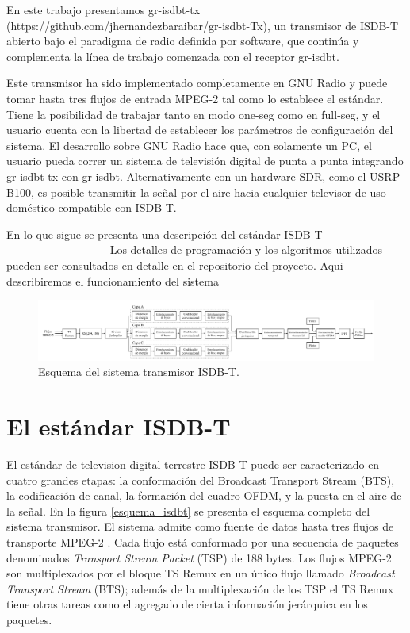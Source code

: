 \documentclass[journal,comsoc]{IEEEtran}
\begin{document}
En este trabajo presentamos gr-isdbt-tx (https://github.com/jhernandezbaraibar/gr-isdbt-Tx), un transmisor de ISDB-T abierto bajo el paradigma de radio definida por software, que continúa y complementa la línea de trabajo comenzada con el receptor gr-isdbt. 

Este transmisor ha sido implementado completamente en GNU Radio y puede tomar hasta tres flujos de entrada MPEG-2 tal como lo establece el estándar. Tiene la posibilidad de trabajar tanto en modo one-seg como en full-seg, y el usuario cuenta con la libertad de establecer los parámetros de configuración del sistema. El desarrollo sobre GNU Radio hace que, con solamente un PC, el usuario pueda correr un sistema de televisión digital de punta a punta integrando gr-isdbt-tx con gr-isdbt. Alternativamente con un hardware SDR, como el USRP B100, es posible transmitir la señal por el aire hacia cualquier televisor de uso doméstico compatible con ISDB-T.

En lo que sigue se presenta una descripción del estándar ISDB-T
---------------------------
Los detalles de programación y los algoritmos utilizados pueden ser consultados en detalle en el repositorio del proyecto. Aqui describiremos el funcionamiento del sistema
\begin{figure}[!h]
\centering
\includegraphics[width=7.1in]{figuras/esquema-tx}
\caption{Esquema del sistema transmisor ISDB-T.}
\label{esquema-tx}
\end{figure}

\section{El estándar ISDB-T}
El estándar de television digital terrestre ISDB-T puede ser caracterizado en cuatro grandes etapas: la conformación del Broadcast Transport Stream (BTS), la codificación de canal, la formación del cuadro OFDM, y la puesta en el aire de la señal. En la figura \ref{esquema_isdbt} se presenta el esquema completo del sistema transmisor.
El sistema admite como fuente de datos hasta tres flujos de transporte MPEG-2 \cite{MPEG}. Cada flujo está conformado por una secuencia de paquetes denominados \textit{Transport Stream Packet} (TSP) de 188 bytes. Los flujos MPEG-2 son multiplexados por el bloque TS Remux en un único flujo llamado \textit{Broadcast Transport Stream} (BTS); además de la multiplexación de los TSP el TS Remux tiene otras tareas como el agregado de cierta información jerárquica en los paquetes.
\end{document}
